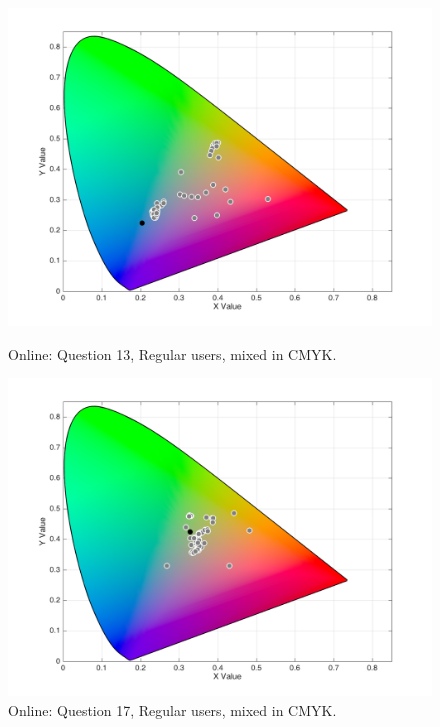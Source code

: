 \begin{figure}[!htbp]
  \centering
  \vspace{-5pt}
  \begin{minipage}{0.4\textwidth}
    \centering
    \includegraphics[width=\textwidth]{images/results/13_online_CMYKresponses.png}
    \caption[Online: Answers for Question 13, from regular users, mixed in CMYK Color Model.]{Online: Question 13, Regular users, mixed in CMYK.}
    \label{fig:onlinecmykregular_13}
  \end{minipage}
  \begin{minipage}{0.4\textwidth}
    \centering
    \includegraphics[width=\textwidth]{images/results/17_online_CMYKresponses.png}
    \caption[Online: Answers for Question 17, from regular users, mixed in CMYK Color Model.]{Online: Question 17, Regular users, mixed in CMYK.}
    \label{fig:onlinecmykregular_17}
  \end{minipage}
  \vspace{-5pt}
\end{figure}
